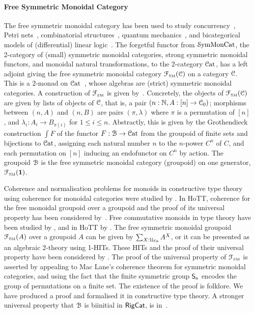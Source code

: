 \paragraph{Free Symmetric Monoidal Category} The free symmetric monoidal category has been used to study
concurrency~\cite{hylandSymmetricMonoidalSketches2004}, Petri nets~\cite{baezCategoriesNets2021}, combinatorial
structures~\cite{fioreCartesianClosedBicategory2008}, quantum mechanics~\cite{abramskyAbstractScalarsLoops2005}, and
bicategorical models of (differential) linear logic~\cite{melliesTemplateGamesDifferential2019}. The forgetful functor
from $\SymMonCat$, the 2-category of (small) symmetric monoidal categories, strong symmetric monoidal functors, and
monoidal natural transformations, to the 2-category $\CatCat$, has a left adjoint giving the free symmetric monoidal
category $\FSM[\CCat{C}]$ on a category $\CCat{C}$. This is a 2-monad on
$\CatCat$~\cite{blackwellTwodimensionalMonadTheory1989}, whose algebras are (strict) symmetric monoidal categories. A
construction of $\FSM$ is given by~\citet{abramskyAbstractScalarsLoops2005}. Concretely, the objects of $\FSM[\CCat{C}]$
are given by lists of objects of $\CCat{C}$, that is, a pair $(n:\Nat, A:[n] \to \CCat{C}_{0})$; morphisms between
$(n,A)$ and $(n,B)$ are pairs $(\pi,\lambda)$ where $\pi$ is a permutation of $[n]$, and $\lambda_{i} : A_{i} \to
B_{\pi(i)}$ for $1 \leq i \leq n$. Abstractly, this is given by the Grothendieck construction $\int F$ of the functor $F
: \BFin \to \CatCat$ from the groupoid of finite sets and bijections to $\CatCat$, assigning each natural number $n$ to
the $n$-power $C^{n}$ of $C$, and each permutation on $[n]$ inducing an endofunctor on $C^{n}$ by action. The groupoid
$\BFin$ is the free symmetric monoidal category (groupoid) on one generator, $\FSM[\unit]$.

Coherence and normalisation problems for monoids in constructive type theory using coherence for monoidal categories
were studied by \citet{beylinExtractingProofCoherence1996}. In HoTT, coherence for the free monoidal groupoid over a
groupoid and the proof of its universal property has been considered
by~\citet{piceghelloCoherenceMonoidalGroupoids2020}. Free commutative monoids in type theory have been studied by
\citet{gylterudMultisetsTypeTheory2020}, and in HoTT by
\citet*{choudhuryFinitemultisetConstructionHoTT2019,choudhuryFreeCommutativeMonoids2021}. The free symmetric monoidal
groupoid $\FSM[A]$ over a groupoid $A$ can be given by $\dsum*{X:\UFin}{A^{X}}$, or it can be presented as an algebraic
2-theory using 1-HITs. These HITs and the proof of their universal property have been considered by
\citet*{piceghelloCoherenceSymmetricMonoidal2019,choudhuryFinitemultisetConstructionHoTT2019}. The proof of the
universal property of $\FSM$ is asserted by appealing to Mac Lane's coherence theorem for symmetric monoidal categories,
and using the fact that the finite symmetric group $\Sn$ encodes the group of permutations on a finite set. The existence of
the proof is folklore. We have produced a proof and formalised it in constructive type theory. A stronger universal
property that $\BFin$ is biinitial in $\operatorname{\mathsf{RigCat}}$, is in~\cite{elguetaGroupoidFiniteSets2021}.

